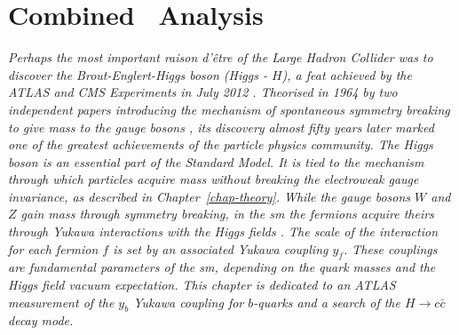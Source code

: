 \chapter[\color{oxfordblue} Combined \vhbc\ Analysis]{\color{oxfordblue} Combined \vhbc\ Analysis}\label{chap-VH} %
\ChapFrame

\textit{Perhaps the most important \textit{raison d'être} of the \textit{Large Hadron Collider} was to discover the Brout-Englert-Higgs boson (Higgs - $H$), a feat achieved by the ATLAS and CMS Experiments in July 2012 \cite{ATLAS:2012yve, CMS:2012qbp}. Theorised in 1964 by two independent papers introducing the mechanism of spontaneous symmetry breaking to give mass to the gauge bosons \cite{Englert:1964et,  PhysRevLett.13.508}, its discovery almost fifty years later marked one of the greatest achievements of the particle physics community. The Higgs boson is an essential part of the Standard Model. It is tied to the mechanism through which particles acquire mass without breaking the electroweak gauge invariance, as described in Chapter~\ref{chap-theory}. While the gauge bosons $W$ and $Z$ gain mass through symmetry breaking, in the \gls{sm} the fermions acquire theirs through Yukawa interactions with the Higgs fields \cite{10.1143/PTPS.1.1}. The scale of the interaction for each fermion $f$ is set by an associated Yukawa coupling $y_f$. These couplings are fundamental parameters of the \gls{sm}, depending on the quark masses and the Higgs field vacuum expectation. This chapter is dedicated to an ATLAS measurement of the $y_b$ Yukawa coupling for $b$-quarks and a search of the $H \rightarrow c\bar{c}$ decay mode.}

